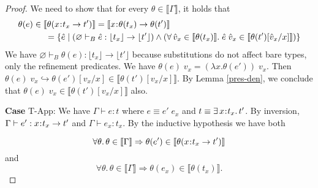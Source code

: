 \documentclass[11pt]{article}
\newcommand{\bind}{\hspace{0.05em}{:}\hspace{0.05em}} %
\newcommand{\lb}{\llbracket}         %
\newcommand{\rb}{\rrbracket}         %
\newcommand{\step}{\hookrightarrow}
\newcommand{\many}{\hookrightarrow^*}
\newcommand{\existype}[3]{\exists\, #1\bind #2.\, #3}
\newcommand{\functype}[3]{#1\bind #2 \rightarrow #3}
\begin{document}
\begin{proof}
We need to show that for every $\theta \in \lb\Gamma\rb$, it holds that 
\begin{align*}
\theta(e) \in \lb \theta(&\functype{x}{t_x}{t'}) \rb = \lb \functype{x}{\theta(t_x)}{\theta(t')}\rb\\
=&\; \{ \hat{e} \;|\; (\varnothing \vdash_B {\hat e} : \lfloor t_x \rfloor \rightarrow \lfloor t' \rfloor) \wedge ( \forall\, \hat v_x \in \lb \theta(t_x) \rb.\; \hat e \; \hat v_x \in \lb\theta(t')[\hat v_x/x] \rb) \}
\end{align*}
We have $\varnothing \vdash_B \theta(e) : \lfloor t_x \rfloor \rightarrow \lfloor t' \rfloor$ because substitutions do not affect bare types, only the refinement predicates.
We have
$\theta(e)\; v_x = (\lambda x.\theta(e'))\; v_x.$
Then  $\theta(e)\; v_x \step \theta(e')[v_x/x] \in \lb \theta(t')[v_x/x]\rb$. By Lemma \ref{pres-den}, we conclude that $\theta(e)\; v_x \in \lb \theta(t')[v_x/x]\rb$ also.

{\bf Case} {\sc T-App}: We have $\Gamma \vdash e : t$ where $e \equiv e'\; e_x$ and $t \equiv \existype{x}{t_x}{t'}$. By inversion,
$\Gamma \vdash e' : \functype{x}{t_x}{t'}$ and $\Gamma \vdash e_x : t_x$. 
By the inductive hypothesis we have both
                                                                                                                                                                                                                                                                                                                                            
\begin{equation}\label{3.8.1}
\forall \theta.\, \theta\in\lb\Gamma\rb \Rightarrow 
\theta(e') \in \lb\theta(\functype{x}{t_x}{t'})\rb\end{equation}
and
\begin{equation}\label{3.8.2}
\forall \theta.\, \theta \in \lb\Gamma\rb \Rightarrow
\theta(e_x) \in \lb\theta(t_x)\rb.
\end{equation}


\end{proof}
\end{document}
